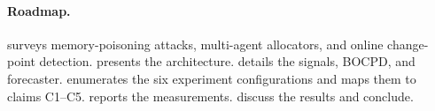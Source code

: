 \paragraph{Roadmap.}
 surveys memory-poisoning attacks, multi-agent
allocators, and online change-point detection.
 presents the \sys{} architecture.
 details the signals, BOCPD, and forecaster.
 enumerates the six experiment configurations
and maps them to claims C1--C5.
 reports the measurements.
 discuss the results and conclude.
